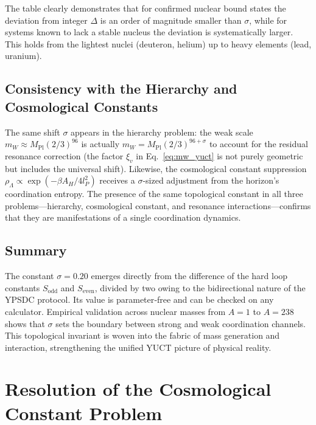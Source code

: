 \documentclass[12pt,a4paper]{article}
\begin{document}
The table clearly demonstrates that for confirmed nuclear bound states the deviation from integer $\Delta$ is an order of magnitude smaller than $\sigma$, while for systems known to lack a stable nucleus the deviation is systematically larger. This holds from the lightest nuclei (deuteron, helium) up to heavy elements (lead, uranium).

\subsection{Consistency with the Hierarchy and Cosmological Constants}

The same shift $\sigma$ appears in the hierarchy problem: the weak scale $m_W \approx M_{\mathrm{Pl}}(2/3)^{96}$ is actually $m_W = M_{\mathrm{Pl}} (2/3)^{96+\sigma}$ to account for the residual resonance correction (the factor $\xi_v$ in Eq.~\ref{eq:mw_yuct} is not purely geometric but includes the universal shift). Likewise, the cosmological constant suppression $\rho_\Lambda \propto \exp(-\beta A_H/4l_P^2)$ receives a $\sigma$-sized adjustment from the horizon's coordination entropy. The presence of the same topological constant in all three problems—hierarchy, cosmological constant, and resonance interactions—confirms that they are manifestations of a single coordination dynamics.

\subsection{Summary}

The constant $\sigma = 0.20$ emerges directly from the difference of the hard loop constants $S_{\mathrm{odd}}$ and $S_{\mathrm{even}}$, divided by two owing to the bidirectional nature of the YPSDC protocol. Its value is parameter‑free and can be checked on any calculator. Empirical validation across nuclear masses from $A=1$ to $A=238$ shows that $\sigma$ sets the boundary between strong and weak coordination channels. This topological invariant is woven into the fabric of mass generation and interaction, strengthening the unified YUCT picture of physical reality.

	\section{Resolution of the Cosmological Constant Problem}
	
\end{document}
